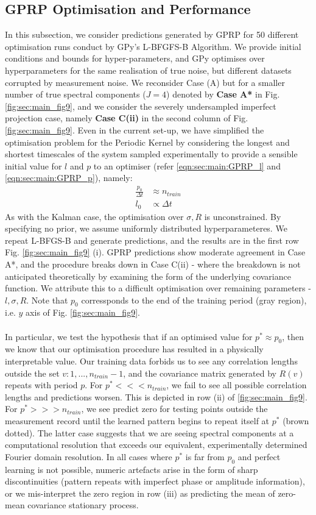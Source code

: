 \subsection{GPRP Optimisation and Performance}
In this subsection, we consider predictions generated by GPRP for 50 different optimisation runs conduct by GPy's L-BFGFS-B Algorithm. We provide initial conditions and bounds for hyper-parameters, and GPy optimises over hyperparameters for the same realisation of true noise, but different datasets corrupted by measurement noise. We reconsider Case (A) but for a smaller number of true spectral components ($J=4$) denoted by \textbf{Case A*} in Fig. \ref{fig:sec:main_fig9}, and we consider the severely undersampled imperfect projection case, namely \textbf{Case C(ii)} in the second column of Fig. \ref{fig:sec:main_fig9}. Even in the current set-up, we have simplified the optimisation problem for the Periodic Kernel by considering the longest and shortest timescales of the system sampled experimentally to provide a sensible initial value for $l$ and $p$ to an optimiser (refer \eqref{eqn:sec:main:GPRP_l} and \eqref{eqn:sec:main:GPRP_p}), namely:
\begin{align}
\frac{p_0}{\Delta t} & \approx n_{train} \\
l_0 & \propto \Delta t 
\end{align} 
As with the Kalman case, the optimisation over $\sigma, R$ is unconstrained. By specifying no prior, we assume uniformly distributed hyperparameteres. We repeat L-BFGS-B and generate predictions, and the results are in the first row Fig. \ref{fig:sec:main_fig9} (i).  GPRP predictions show moderate agreement in Case A*, and the procedure breaks down in Case C(ii) - where the breakdown is not anticipated theoretically by examining the form of the underlying covariance function. We attribute this to a difficult optimisation over remaining parameters - $l, \sigma, R$. Note that $p_0$ corressponds to the end of the training period (gray region), i.e. $y$ axis of Fig. \ref{fig:sec:main_fig9}. 
\\
\\
In particular, we test the hypothesis that if an optimised value for $p^* \approx p_0$, then we know that our optimisation procedure has resulted in a physically interpretable value.  Our training data forbids us to see any correlation lengths outside the set ${v: 1, ..., n_{train} -1 }$, and the covariance matrix generated by $R(v)$ repeats with period $p$. For $p^* <<< n_{train}$, we fail to see all possible correlation lengths and predictions worsen. This is depicted in row (ii) of \ref{fig:sec:main_fig9}. For $p^* >>> n_{train}$, we see predict zero for testing points outside the measurement record until the learned pattern begins to repeat itself at $p^*$ (brown dotted). The latter case suggests that we are seeing spectral components at a computational resolution that exceeds our equivalent, experimentally determined Fourier domain resolution. In all cases where $p^*$ is far from $p_0$ and perfect learning is not possible, numeric artefacts arise in the form of sharp discontinuities (pattern repeats with imperfect phase or amplitude information), or we mis-interpret the zero region in row (iii) as predicting the mean of zero-mean covariance stationary process. 

